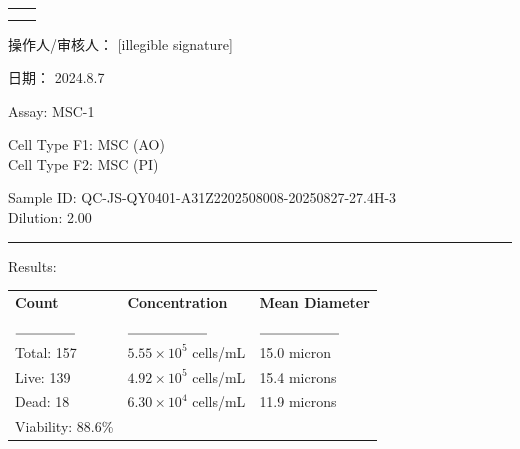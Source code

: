 \documentclass[UTF8,10pt,a4paper,fontset=fandol]{ctexart}
\newcommand{\fieldvalue}[1]{#1}
\newcommand{\handwritten}[1]{#1}
\begin{document}
\vspace{1.2em}

\begin{center}
\begin{tabular}{cc}
\fbox{\parbox[c][0.22\textheight][c]{0.40\textwidth}{\centering
}} &
\fbox{\parbox[c][0.22\textheight][c]{0.40\textwidth}{\centering
}} \\[1em]
\fbox{\parbox[c][0.22\textheight][c]{0.40\textwidth}{\centering
}} &
\fbox{\parbox[c][0.22\textheight][c]{0.40\textwidth}{\centering
}}
\end{tabular}
\end{center}

\vfill

\noindent
操作人/审核人：
\fieldvalue{\handwritten{[illegible signature]}}

\hfill
日期：
\fieldvalue{\handwritten{2024.8.7}}

\newpage

Assay: MSC-1

Cell Type F1: MSC (AO)\\
Cell Type F2: MSC (PI)

Sample ID: QC-JS-QY0401-A31Z2202508008-20250827-27.4H-3\\
Dilution: 2.00

\noindent\rule{\textwidth}{0.4pt}

Results:

\begin{tabularx}{\textwidth}{XXX}
\textbf{Count} & \textbf{Concentration} & \textbf{Mean Diameter} \\
\(\underline{\hspace{1.5cm}}\) & \(\underline{\hspace{2.0cm}}\) & \(\underline{\hspace{2.0cm}}\) \\
Total: 157 & \(5.55\times10^5\) cells/mL & 15.0 micron \\
Live: 139 & \(4.92\times10^5\) cells/mL & 15.4 microns \\
Dead: 18 & \(6.30\times10^4\) cells/mL & 11.9 microns \\
Viability: 88.6\% & & 
\end{tabularx}
\end{document}
